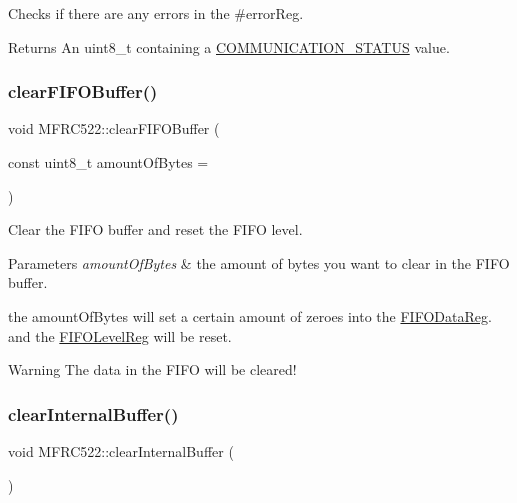 Checks if there are any errors in the \#error\+Reg. 

\begin{DoxyReturn}{Returns}
An uint8\+\_\+t containing a \mbox{\hyperlink{class_m_f_r_c522_a1160642f3b2b60b5ea7309374a8d760a}{C\+O\+M\+M\+U\+N\+I\+C\+A\+T\+I\+O\+N\+\_\+\+S\+T\+A\+T\+US}} value. 
\end{DoxyReturn}
\mbox{\label{class_m_f_r_c522_a0fa1703360d0c741cf915b22e26c2631}} 
\subsubsection{\texorpdfstring{clear\+F\+I\+F\+O\+Buffer()}{clearFIFOBuffer()}}
{\footnotesize\ttfamily void M\+F\+R\+C522\+::clear\+F\+I\+F\+O\+Buffer (\begin{DoxyParamCaption}\item[{const uint8\+\_\+t}]{amount\+Of\+Bytes = {} }\end{DoxyParamCaption})\hspace{0.3cm}{\ttfamily [private]}}



Clear the F\+I\+FO buffer and reset the F\+I\+FO level. 


\begin{DoxyParams}{Parameters}
{\em amount\+Of\+Bytes} & the amount of bytes you want to clear in the F\+I\+FO buffer.\\
\hline
\end{DoxyParams}
the amount\+Of\+Bytes will set a certain amount of zeroes into the \mbox{\hyperlink{class_m_f_r_c522_ae7ec09eb8c9c61288a4770175b4b8db7afdbfd2f397b96d1043c808ec26e80328}{F\+I\+F\+O\+Data\+Reg}}. and the \mbox{\hyperlink{class_m_f_r_c522_ae7ec09eb8c9c61288a4770175b4b8db7a35e5daf30358a0a271dadf50ba6bb4e7}{F\+I\+F\+O\+Level\+Reg}} will be reset. \begin{DoxyWarning}{Warning}
The data in the F\+I\+FO will be cleared! 
\end{DoxyWarning}
\mbox{\label{class_m_f_r_c522_a9d2c5ad7b977944e8bcbbcc9c1bb9b75}} 
\subsubsection{\texorpdfstring{clear\+Internal\+Buffer()}{clearInternalBuffer()}}
{\footnotesize\ttfamily void M\+F\+R\+C522\+::clear\+Internal\+Buffer (\begin{DoxyParamCaption}{ }\end{DoxyParamCaption})\hspace{0.3cm}{\ttfamily [private]}}



